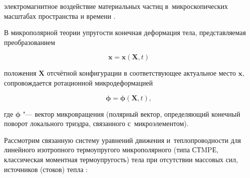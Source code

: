 электромагнитное воздействие материальных частиц в~микроскопических масштабах пространства и времени \cite{kosygina:Eringen}.



В микрополярной теории упругости конечная деформация тела, представляемая преобразованием

$$

\mathbf{ x}=\mathbf{ x}(\mathbf{ X},t)

$$

положения $\mathbf{ X}$ отсчётной конфигурации в соответствующее актуальное место $\mathbf x$, сопровождается ротационной микродеформацией

$$

\boldsymbol{\phi}=\boldsymbol{\phi}(\mathbf{ X},t),

$$

где $\boldsymbol{\phi}$ "--- вектор микровращения (полярный вектор, определяющий конечный поворот локального триэдра, связанного с~микроэлементом).



\smallskip




Рассмотрим связанную систему уравнений движения и~теплопроводности для линейного изотропного термоупругого микрополярного (типа СТMPЕ, классическая  моментная термоупругость) тела при отсутствии массовых сил, источников (стоков) тепла \cite{kosygina:nowacki}:



